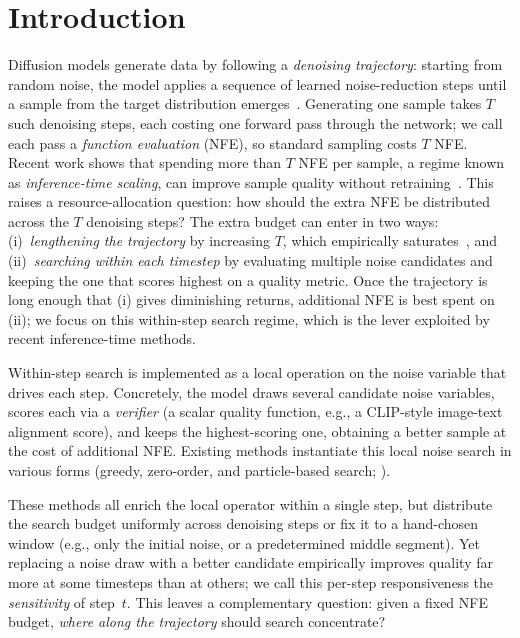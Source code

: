 \section{Introduction}
\label{sec:intro}

Diffusion models generate data by following a \emph{denoising trajectory}: starting from random noise, the model applies a sequence of learned noise-reduction steps until a sample from the target distribution emerges~\citep{ho2020denoising,song2019generative,song2021scorebased}. Generating one sample takes $T$ such denoising steps, each costing one forward pass through the network; we call each pass a \emph{function evaluation} (NFE), so standard sampling costs $T$ NFE.
Recent work shows that spending more than $T$ NFE per sample, a regime known as \emph{inference-time scaling}, can improve sample quality without retraining~\citep{ma2024inference,ramesh2025nts}.
This raises a resource-allocation question: how should the extra NFE be distributed across the $T$ denoising steps?
The extra budget can enter in two ways: (i)~\emph{lengthening the trajectory} by increasing $T$, which empirically saturates~\citep{ma2024inference}, and (ii)~\emph{searching within each timestep} by evaluating multiple noise candidates and keeping the one that scores highest on a quality metric.
Once the trajectory is long enough that (i) gives diminishing returns, additional NFE is best spent on (ii); we focus on this within-step search regime, which is the lever exploited by recent inference-time methods.

Within-step search is implemented as a local operation on the noise variable that drives each step.
Concretely, the model draws several candidate noise variables, scores each via a \emph{verifier} (a scalar quality function, e.g., a CLIP-style image-text alignment score), and keeps the highest-scoring one, obtaining a better sample at the cost of additional NFE.
Existing methods instantiate this local noise search in various forms (greedy, zero-order, and particle-based search; \citealt{ramesh2025nts,tang2024dno,kim2025rbf}).

These methods all enrich the local operator within a single step, but distribute the search budget uniformly across denoising steps or fix it to a hand-chosen window (e.g., only the initial noise, or a predetermined middle segment).
Yet replacing a noise draw with a better candidate empirically improves quality far more at some timesteps than at others; we call this per-step responsiveness the \emph{sensitivity} of step~$t$.
This leaves a complementary question: given a fixed NFE budget, \emph{where along the trajectory} should search concentrate?

